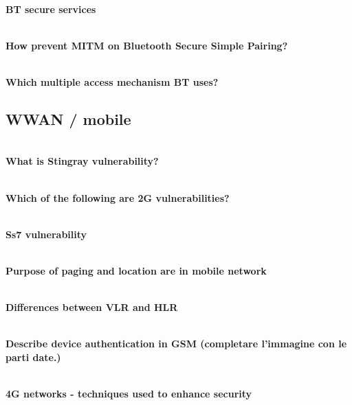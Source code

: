 \textbf{\\BT secure services}

\textbf{\\How prevent MITM on Bluetooth Secure Simple Pairing?}

\textbf{\\Which multiple access mechanism BT uses?}


\subsection{WWAN / mobile}

\textbf{\\What is Stingray vulnerability?}

\textbf{\\Which of the following are 2G vulnerabilities?}


\textbf{\\Ss7 vulnerability}


\textbf{\\Purpose of paging and location are in mobile network}


\textbf{\\Differences between VLR and HLR}

\textbf{\\Describe device authentication in GSM (completare l’immagine con le parti date.)}

\textbf{\\4G networks - techniques used to enhance security}

